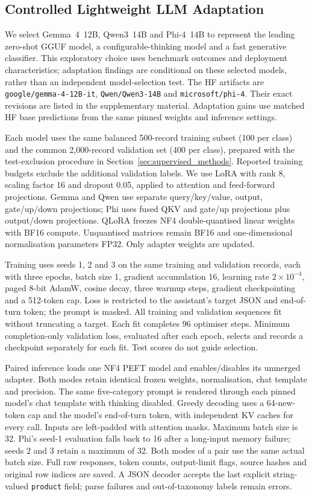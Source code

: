 \subsection{Controlled Lightweight LLM Adaptation}
\label{sec:qlora_methods}

We select Gemma~4~12B, Qwen3~14B and Phi-4~14B to represent the leading
zero-shot GGUF model, a configurable-thinking model and a fast
generative classifier. This exploratory choice uses benchmark outcomes
and deployment characteristics; adaptation findings are conditional on
these selected models, rather than an independent model-selection test.
The HF artifacts are
\texttt{google/gemma-4-12B-it}, \texttt{Qwen/Qwen3-14B} and
\texttt{microsoft/phi-4}. Their exact revisions are listed in the
supplementary material. Adaptation gains use matched HF base
predictions from the same pinned weights and inference settings.

Each model uses the same balanced 500-record training subset (100 per
class) and the common 2,000-record validation set (400 per class),
prepared with the test-exclusion procedure in Section~\ref{sec:supervised_methods}.
Reported training budgets exclude the additional validation labels.
We use LoRA \cite{hu2021lora} with rank 8, scaling factor 16 and dropout
0.05, applied to attention and feed-forward projections. Gemma and
Qwen use separate query/key/value, output, gate/up/down projections;
Phi uses fused QKV and gate/up projections plus output/down projections.
QLoRA \cite{dettmers2023qlora} freezes NF4 double-quantised linear
weights with BF16 compute. Unquantised matrices remain BF16 and
one-dimensional normalisation parameters FP32. Only adapter weights
are updated.

Training uses seeds 1, 2 and 3 on the same training and validation records,
each with three epochs, batch size 1, gradient accumulation
16, learning rate $2\times10^{-4}$, paged 8-bit AdamW, cosine decay,
three warmup steps, gradient checkpointing and a 512-token cap.
Loss is restricted to the assistant's target JSON and end-of-turn token;
the prompt is masked. All training and validation sequences fit without
truncating a target. Each fit completes 96 optimiser steps. Minimum completion-only
validation loss, evaluated after each epoch, selects and records a
checkpoint separately for each fit. Test scores do not guide selection.

Paired inference loads one NF4 PEFT model and enables/disables its
unmerged adapter. Both modes retain identical frozen weights,
normalisation, chat template and precision. The same five-category
prompt is rendered through each pinned model's chat template with
thinking disabled. Greedy decoding uses a 64-new-token cap and the
model's end-of-turn token, with independent KV caches for every call.
Inputs are left-padded with attention masks. Maximum batch size is 32.
Phi's seed-1 evaluation falls back to 16 after a long-input memory
failure; seeds 2 and 3 retain a maximum of 32. Both modes of
a pair use the same actual batch size. Full raw responses, token counts,
output-limit flags, source hashes and original row indices are saved.
A JSON decoder accepts the last explicit string-valued \texttt{product}
field; parse failures and out-of-taxonomy labels remain errors.

